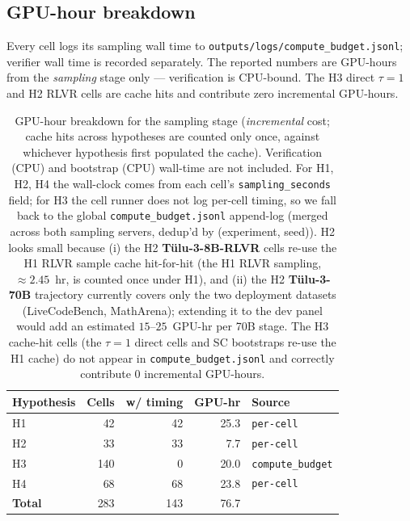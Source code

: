 \subsection{GPU-hour breakdown}
\label{app:config:cost}

Every cell logs its sampling wall time to
\texttt{outputs/logs/compute\_budget.jsonl}; verifier wall time is
recorded separately. The reported numbers are GPU-hours from the
\emph{sampling} stage only — verification is CPU-bound. The H3 direct
$\tau{=}1$ and H2 RLVR cells are cache hits and contribute zero
incremental GPU-hours.

\begin{table}[htbp]
\centering
\small
\caption{GPU-hour breakdown for the sampling stage (\emph{incremental} cost; cache hits across hypotheses are counted only once, against whichever hypothesis first populated the cache). Verification (CPU) and bootstrap (CPU) wall-time are not included. For H1, H2, H4 the wall-clock comes from each cell's \texttt{sampling\_seconds} field; for H3 the cell runner does not log per-cell timing, so we fall back to the global \texttt{compute\_budget.jsonl} append-log (merged across both sampling servers, dedup'd by (experiment, seed)). H2 looks small because (i) the H2 \textbf{Tülu-3-8B-RLVR} cells re-use the H1 RLVR sample cache hit-for-hit (the H1 RLVR sampling, $\approx 2.45$~hr, is counted once under H1), and (ii) the H2 \textbf{Tülu-3-70B} trajectory currently covers only the two deployment datasets (LiveCodeBench, MathArena); extending it to the dev panel would add an estimated $15\text{--}25$~GPU-hr per 70B stage. The H3 cache-hit cells (the $\tau{=}1$ direct cells and SC bootstraps re-use the H1 cache) do not appear in \texttt{compute\_budget.jsonl} and correctly contribute $0$ incremental GPU-hours.}
\label{tab:appendix_gpu_hours}
\begin{tabular}{lrrrl}
\toprule
Hypothesis & Cells & w/ timing & GPU-hr & Source \\
\midrule
H1 & 42 & 42 & 25.3 & \texttt{per-cell} \\
H2 & 33 & 33 & 7.7 & \texttt{per-cell} \\
H3 & 140 & 0 & 20.0 & \texttt{compute\_budget} \\
H4 & 68 & 68 & 23.8 & \texttt{per-cell} \\
\midrule
\textbf{Total} & 283 & 143 & 76.7 & \\
\bottomrule
\end{tabular}
\end{table}

